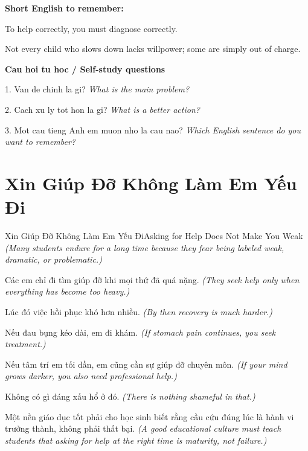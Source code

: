 \begin{ghinhoanh}
\textbf{Short English to remember:}

To help correctly, you must diagnose correctly.

Not every child who slows down lacks willpower; some are simply out of charge.

\end{ghinhoanh}

\begin{tuhocnhanh}
\textbf{Cau hoi tu hoc / Self-study questions}

1. Van de chinh la gi? \textit{What is the main problem?}

2. Cach xu ly tot hon la gi? \textit{What is a better action?}

3. Mot cau tieng Anh em muon nho la cau nao? \textit{Which English sentence do you want to remember?}
\end{tuhocnhanh}
\ngancach

\section{Xin Giúp Đỡ Không Làm Em Yếu Đi}
\begin{truyen}{Xin Giúp Đỡ Không Làm Em Yếu Đi}{Asking for Help Does Not Make You Weak}
\textit{(Many students endure for a long time because they fear being labeled weak, dramatic, or problematic.)}

Các em chỉ đi tìm giúp đỡ khi mọi thứ đã quá nặng.
\textit{(They seek help only when everything has become too heavy.)}

Lúc đó việc hồi phục khó hơn nhiều.
\textit{(By then recovery is much harder.)}

Nếu đau bụng kéo dài, em đi khám.
\textit{(If stomach pain continues, you seek treatment.)}

Nếu tâm trí em tối dần, em cũng cần sự giúp đỡ chuyên môn.
\textit{(If your mind grows darker, you also need professional help.)}

Không có gì đáng xấu hổ ở đó.
\textit{(There is nothing shameful in that.)}

Một nền giáo dục tốt phải cho học sinh biết rằng cầu cứu đúng lúc là hành vi trưởng thành, không phải thất bại.
\textit{(A good educational culture must teach students that asking for help at the right time is maturity, not failure.)}

\end{truyen}

